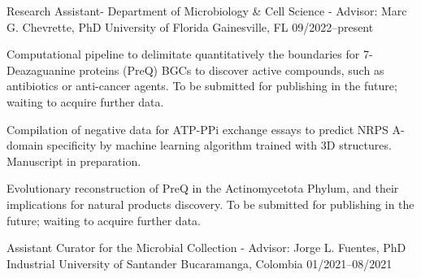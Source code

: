 {}

\begin{cventries}

\cventry
{Research Assistant- Department of Microbiology \& Cell Science - Advisor: Marc G. Chevrette, PhD}
{University of Florida}
{Gainesville, FL}
{09/2022--present}
{
\begin{cvitems} %
\item {Computational pipeline to delimitate quantitatively the boundaries for 7-Deazaguanine proteins (PreQ) BGCs to discover active compounds, such as antibiotics or anti-cancer agents. To be submitted for publishing in the future; waiting to acquire further data.}
\item {Compilation of negative data for ATP-PPi exchange essays to predict NRPS A-domain specificity by machine learning algorithm trained with 3D structures. Manuscript in preparation.}
\item {Evolutionary reconstruction of PreQ in the Actinomycetota Phylum, and their implications for natural products discovery. To be submitted for publishing in the future; waiting to acquire further data.}
\end{cvitems}
}
\vspace{0cm}

\cventry
{Assistant Curator for the Microbial Collection - Advisor: Jorge L. Fuentes, PhD}
{Industrial University of Santander}
{Bucaramanga, Colombia}
{01/2021--08/2021}
{}


\end{cventries}
